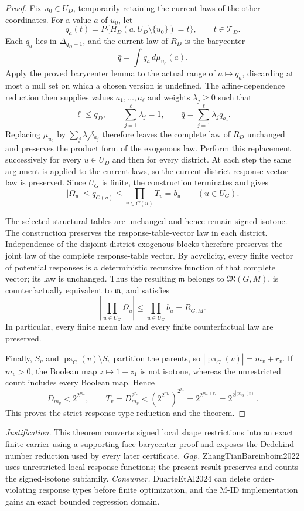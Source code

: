 \documentclass{article}
\begin{document}
\begin{proof}
Fix \(u_0\in U_D\), temporarily retaining the current laws of the other coordinates.  For a value \(a\) of \(u_0\), let
\[
 q_a(t)=P\{H_D(a,U_D\setminus\{u_0\})=t\},
 \qquad t\in\mathcal T_D.
\]
Each \(q_a\) lies in \(\Delta_{q_D-1}\), and the current law of \(R_D\) is the barycenter
\[
 \bar q=\int q_a\,d\mu_{u_0}(a).
\]
Apply the proved barycenter lemma to the actual range of \(a\mapsto q_a\), discarding at most a null set on which a chosen version is undefined.  The affine-dependence reduction then supplies values \(a_1,\ldots,a_\ell\) and weights \(\lambda_j\ge0\) such that
\[
 \ell\le q_D,
 \qquad
 \sum_{j=1}^{\ell}\lambda_j=1,
 \qquad
 \bar q=\sum_{j=1}^{\ell}\lambda_jq_{a_j}.
\]
Replacing \(\mu_{u_0}\) by \(\sum_j\lambda_j\delta_{a_j}\) therefore leaves the complete law of \(R_D\) unchanged and preserves the product form of the exogenous law.  Perform this replacement successively for every \(u\in U_D\) and then for every district.  At each step the same argument is applied to the current laws, so the current district response-vector law is preserved.  Since \(U_G\) is finite, the construction terminates and gives
\[
 |\Omega_u|\le q_{C(u)}\le\prod_{v\in C(u)}T_v=b_u
 \qquad (u\in U_G).
\]

The selected structural tables are unchanged and hence remain signed-isotone.  The construction preserves the response-table-vector law in each district.  Independence of the disjoint district exogenous blocks therefore preserves the joint law of the complete response-table vector.  By acyclicity, every finite vector of potential responses is a deterministic recursive function of that complete vector; its law is unchanged.  Thus the resulting \(\widetilde{\mathfrak m}\) belongs to \(\mathfrak M(G,M)\), is counterfactually equivalent to \(\mathfrak m\), and satisfies
\[
 \left|\prod_{u\in U_G}\Omega_u\right|
 \le\prod_{u\in U_G}b_u=R_{G,M}.
\]
In particular, every finite menu law and every finite counterfactual law are preserved.

Finally, \(S_v\) and \(\operatorname{pa}_G(v)\setminus S_v\) partition the parents, so \(|\operatorname{pa}_G(v)|=m_v+r_v\).  If \(m_v>0\), the Boolean map \(z\mapsto1-z_1\) is not isotone, whereas the unrestricted count includes every Boolean map.  Hence
\[
 D_{m_v}<2^{2^{m_v}},
 \qquad
 T_v=D_{m_v}^{2^{r_v}}
 <\left(2^{2^{m_v}}\right)^{2^{r_v}}
 =2^{2^{m_v+r_v}}
 =2^{2^{|\operatorname{pa}_G(v)|}}.
\]
This proves the strict response-type reduction and the theorem.
\end{proof}
\par\smallskip\noindent \textit{Justification.} This theorem converts signed local shape restrictions into an exact finite carrier using a supporting-face barycenter proof and exposes the Dedekind-number reduction used by every later certificate. \textit{Gap.} ZhangTianBareinboim2022 uses unrestricted local response functions; the present result preserves and counts the signed-isotone subfamily. \textit{Consumer.} DuarteEtAl2024 can delete order-violating response types before finite optimization, and the M-ID implementation gains an exact bounded regression domain.
\end{document}
